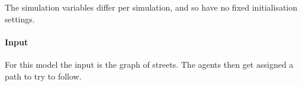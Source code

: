 The simulation variables differ per simulation, and so have no fixed initialisation settings.


\paragraph{Input}
\label{par:method:model:details:input}

For this model the input is the graph of streets. The agents then get assigned a path to try to follow. 


